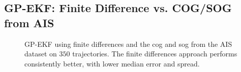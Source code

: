 \subsection{GP-EKF: Finite Difference vs. COG/SOG from AIS}

\begin{figure}[h]
    \centering
    \caption{GP-EKF using finite differences and the \acrshort{cog} and \acrshort{sog} from the AIS dataset on $350$ trajectories. The finite differences approach performs consistently better, with lower median error and spread.}
    \label{fig:stats_gp_ekf_fd_vs_cog}
\end{figure}


